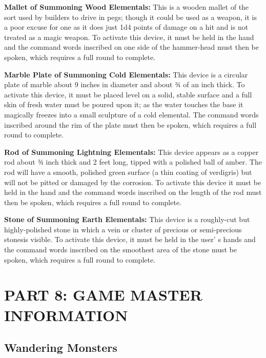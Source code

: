 \documentclass[a4paper,twoside,openany,10pt]{book}
\begin{document}
\begin{multicols}{2}
\textbf{Mallet of Summoning Wood Elementals: }This is a wooden mallet of the sort used by builders to drive in pegs; though it could be used as a weapon, it is a poor excuse for one as it does just 1d4 points of damage on a hit and is not treated as a magic weapon. To activate this device, it must be held in the hand and the command words inscribed on one side of the hammer-head must then be spoken, which requires a full round to complete.

\textbf{Marble Plate of Summoning Cold Elementals:} This device is a circular plate of marble about 9 inches in diameter and about ¾ of an inch thick. To activate this device, it must be placed level on a solid, stable surface and a full skin of fresh water must be poured upon it; as the water touches the base it magically freezes into a small sculpture of a cold elemental. The command words inscribed around the rim of the plate must then be spoken, which requires a full round to complete.

\textbf{Rod of Summoning Lightning Elementals:} This device appears as a copper rod about ¾ inch thick and 2 feet long, tipped with a polished ball of amber. The rod will have a smooth, polished green surface (a thin coating of verdigris) but will not be pitted or damaged by the corrosion. To activate this device it must be held in the hand and the command words inscribed on the length of the rod must then be spoken, which requires a full round to complete.

\textbf{Stone of Summoning Earth Elementals:} This device is a roughly-cut but highly-polished stone in which a vein or cluster of precious or semi-precious stonesis  visible. To activate this device, it must be held in the user' s hands and the command words inscribed on the smoothest area of the stone must be spoken, which requires a full round to complete.

\end{multicols}

\pagebreak

\section{PART 8: GAME MASTER INFORMATION}\label{part-8-game-master-information}

\subsection{Wandering Monsters}\label{wandering-monsters}
\end{document}
